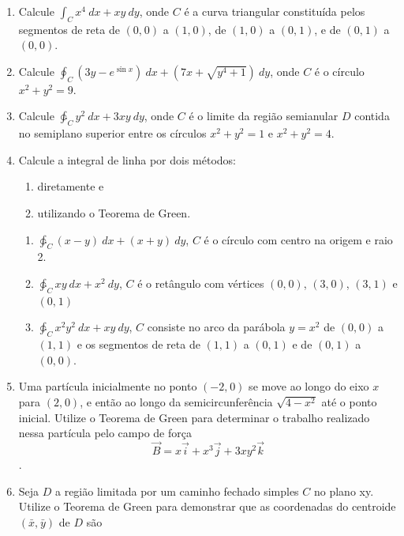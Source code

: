 \documentclass[11pt,a4paper]{article}
\begin{document}
\begin{enumerate}
     \item Calcule $\displaystyle\int_C x^4 \ dx + xy \ dy$, onde $C$ é a curva triangular constituída pelos segmentos de reta de $(0 \textrm{,}\ 0)$ a $(1 \textrm{,}\ 0)$, de $(1 \textrm{,}\ 0)$ a $(0 \textrm{,}\ 1)$, e de $(0 \textrm{,}\ 1)$ a $(0 \textrm{,}\ 0)$.
     
     \item Calcule $\displaystyle\oint_C(3y - e^{\sin x}) \ dx + (7x + \sqrt{y^4 + 1}) \ dy$, onde $C$ é o círculo $x^2 + y^2 = 9$.
     
\item Calcule $\displaystyle\ointctrclockwise_C y^2 \ dx + 3xy \ dy$, onde $C$ é o limite da região semianular $D$ contida no semiplano superior entre os círculos $x^2 + y^2 = 1$ e $x^2 + y^2 = 4$.

\item Calcule a integral de linha por dois métodos: 

\begin{enumerate}
\item diretamente e 
\item utilizando o Teorema de Green.
\end{enumerate}


\begin{enumerate}[label=(\roman*)]
       \item $\displaystyle\ointctrclockwise_C (x - y) \ dx + (x + y) \ dy$, $C$ é o círculo com centro na origem e raio 2.
       \item $\displaystyle\ointctrclockwise_C xy \ dx + x^2 \ dy$, $C$ é o retângulo com vértices $(0 \textrm{,}\ 0)$, $(3 \textrm{,}\ 0)$, $(3 \textrm{,}\ 1)$ e $(0 \textrm{,}\ 1)$
       \item $\displaystyle\ointctrclockwise_C x^2y^2 \ dx + xy \ dy$, $C$ consiste no arco da parábola $y = x^2$ de $(0 \textrm{,}\ 0)$ a $(1 \textrm{,}\ 1)$ e os segmentos de reta de $(1 \textrm{,}\ 1)$ a $(0 \textrm{,}\ 1)$ e de $(0 \textrm{,}\ 1)$ a $(0 \textrm{,}\ 0)$. 
\end{enumerate}
      
\item Uma partícula inicialmente no ponto $(-2 \textrm{,}\ 0)$ se move ao longo do eixo $x$ para $(2 \textrm{,}\ 0)$, e então ao longo da semicircunferência $\sqrt{4 - x^2}$ até o ponto inicial. Utilize o Teorema de Green para determinar o trabalho realizado nessa partícula pelo campo de força $$\vec{B} = x\vec{i} + x^3\vec{j} + 3xy^2\vec{k}$$. 

\item Seja $D$ a região limitada por um caminho fechado simples $C$ no plano xy. Utilize o Teorema de Green para demonstrar que as coordenadas do centroide $(\bar{x} \textrm{,}\ \bar{y})$ de $D$ são


\end{enumerate}
\end{document}
